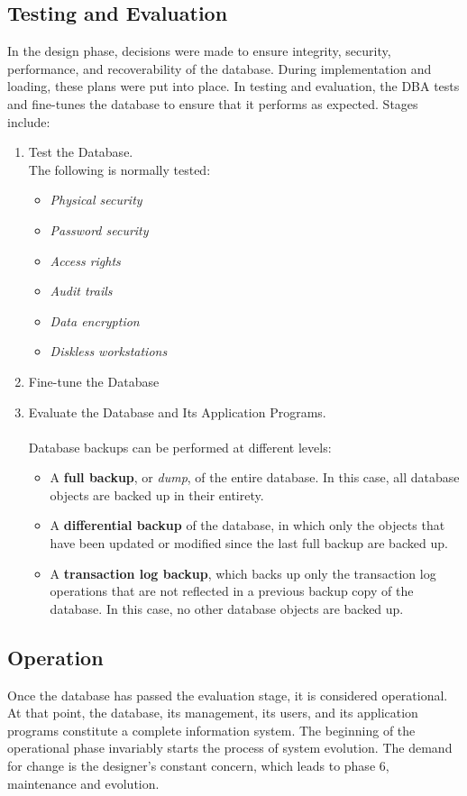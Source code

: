 \documentclass[a4paper, 12pt, titlepage]{report}
\begin{document}
\subsection{Testing and	Evaluation}
In the design phase, decisions were made to ensure integrity, security, performance, and recoverability of the database. During implementation and loading, these plans were put into place. In testing and evaluation, the DBA tests and fine-tunes the database to ensure that it performs as expected. Stages include:
\begin{enumerate}
\item Test the Database. \\ The following is normally tested:
\begin{itemize}
\item \emph{Physical security}
\item \emph{Password security }
\item \emph{Access rights}
\item \emph{Audit trails }
\item \emph{Data encryption}
\item \emph{Diskless workstations}
\end{itemize}
\item Fine-tune the Database
\item Evaluate the Database and Its Application Programs. \\ \\ Database backups can be performed at different levels:
\begin{itemize}
\item A \textbf{full backup}, or \emph{dump}, of the entire database. In this case, all database objects are backed up in their entirety.
\item A \textbf{differential backup} of the database, in which only the objects that have been updated or modified since the last full backup are backed up.
\item A \textbf{transaction log backup}, which backs up only the transaction log operations that are not reflected in a previous backup copy of the database. In this case, no other database objects are backed up. 
\end{itemize}
\end{enumerate}
\subsection{Operation}
Once the database has passed the evaluation stage, it is considered operational. At that point, the database, its management, its users, and its application programs constitute a
complete information system. The beginning of the operational phase invariably starts the process of system evolution. The demand for change is the designer’s constant concern, which leads to phase 6, maintenance and evolution.
\end{document}
